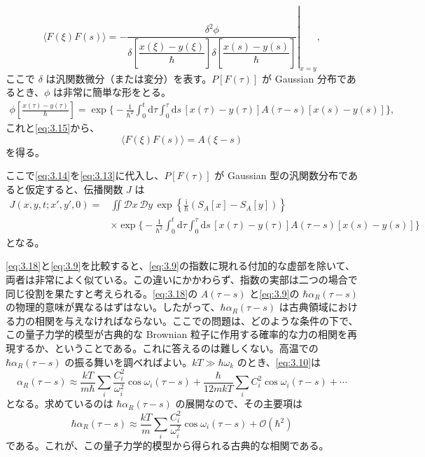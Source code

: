 \begin{equation}
\langle F(\xi)F(s)\rangle
=-\left.
\frac{\delta^2\phi}
{\delta\!\left[\dfrac{x(\xi)-y(\xi)}{\hbar}\right]
 \delta\!\left[\dfrac{x(s)-y(s)}{\hbar}\right]}
\right|_{x=y},
\tag{3.15}\label{eq:3.15}
\end{equation}
ここで $\delta$ は汎関数微分（または変分）を表す。$P[F(\tau)]$ が Gaussian 分布であるとき、$\phi$ は非常に簡単な形をとる\cite{ref22}。
\begin{equation}
\begin{aligned}
\phi\!\left[\frac{x(\tau)-y(\tau)}{\hbar}\right]
=\exp\biggl\{-\frac{1}{\hbar^2}\int_0^t\!\mathrm d\tau\int_0^\tau\!\mathrm ds\,
[x(\tau)-y(\tau)]A(\tau-s)[x(s)-y(s)]\biggr\},
\end{aligned}
\tag{3.16}\label{eq:3.16}
\end{equation}
これと\eqref{eq:3.15}から、
\begin{equation}
\langle F(\xi)F(s)\rangle=A(\xi-s)
\tag{3.17}\label{eq:3.17}
\end{equation}
を得る。

ここで\eqref{eq:3.14}を\eqref{eq:3.13}に代入し、$P[F(\tau)]$ が Gaussian 型の汎関数分布であると仮定すると、伝播関数 $J$ は
\begin{equation}
\begin{aligned}
J(x,y,t;x',y',0)
={}&\iint\mathcal D x\,\mathcal D y\,
\exp\!\left\{\frac{\mathrm i}{\hbar}(S_A[x]-S_A[y])\right\}\\
&\times\exp\biggl\{-\frac{1}{\hbar^2}
\int_0^t\!\mathrm d\tau\int_0^\tau\!\mathrm ds\,
[x(\tau)-y(\tau)]A(\tau-s)[x(s)-y(s)]\biggr\}
\end{aligned}
\tag{3.18}\label{eq:3.18}
\end{equation}
となる。

\eqref{eq:3.18}と\eqref{eq:3.9}を比較すると、\eqref{eq:3.9}の指数に現れる付加的な虚部を除いて、両者は非常によく似ている。この違いにかかわらず、指数の実部は二つの場合で同じ役割を果たすと考えられる。\eqref{eq:3.18}の $A(\tau-s)$ と\eqref{eq:3.9}の $\hbar\alpha_R(\tau-s)$ の物理的意味が異なるはずはない。したがって、$\hbar\alpha_R(\tau-s)$ は古典領域における力の相関を与えなければならない。ここでの問題は、どのような条件の下で、この量子力学的模型が古典的な Brownian 粒子に作用する確率的な力の相関を再現するか、ということである。これに答えるのは難しくない。高温での $\hbar\alpha_R(\tau-s)$ の振る舞いを調べればよい。$kT\gg\hbar\omega_k$ のとき、\eqref{eq:3.10}は
\begin{equation}
\alpha_R(\tau-s)\approx
\frac{kT}{m\hbar}\sum_i\frac{C_i^2}{\omega_i^2}\cos\omega_i(\tau-s)
+\frac{\hbar}{12mkT}\sum_i C_i^2\cos\omega_i(\tau-s)+\cdots
\tag{3.19}\label{eq:3.19}
\end{equation}
となる。求めているのは $\hbar\alpha_R(\tau-s)$ の展開なので、その主要項は
\begin{equation}
\hbar\alpha_R(\tau-s)\approx
\frac{kT}{m}\sum_i\frac{C_i^2}{\omega_i^2}\cos\omega_i(\tau-s)
+\mathcal O(\hbar^2)
\tag{3.20}\label{eq:3.20}
\end{equation}
である。これが、この量子力学的模型から得られる古典的な相関である。

